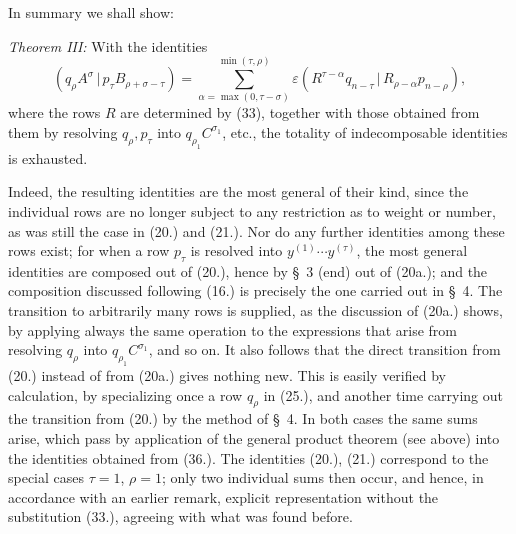 \documentclass[11pt]{article}
\newcommand{\pair}[2]{(#1\,|\,#2)}
\newcommand{\eps}{\varepsilon}
\begin{document}
In summary we shall show:

\emph{Theorem III:} With the identities
\begin{equation}
 \pair{q_\rho A^\sigma}{p_\tau B_{\rho+\sigma-\tau}}
 =\sum_{\alpha=\max(0,\tau-\sigma)}^{\min(\tau,\rho)}
 \eps\pair{R^{\tau-\alpha}q_{n-\tau}}{R_{\rho-\alpha}p_{n-\rho}},
\tag{36}
\end{equation}
where the rows $R$ are determined by (33), together with those obtained from them by resolving $q_\rho,p_\tau$ into $q_{\rho_1}C^{\sigma_1}$, etc., the totality of indecomposable identities is exhausted.

Indeed, the resulting identities are the most general of their kind, since the individual rows are no longer subject to any restriction as to weight or number, as was still the case in (20.) and (21.). Nor do any further identities among these rows exist; for when a row $p_\tau$ is resolved into $y^{(1)}\cdots y^{(\tau)}$, the most general identities are composed out of (20.), hence by \S\ 3 (end) out of (20a.); and the composition discussed following (16.) is precisely the one carried out in \S\ 4. The transition to arbitrarily many rows is supplied, as the discussion of (20a.) shows, by applying always the same operation to the expressions that arise from resolving $q_\rho$ into $q_{\rho_1}C^{\sigma_1}$, and so on. It also follows that the direct transition from (20.) instead of from (20a.) gives nothing new. This is easily verified by calculation, by specializing once a row $q_\rho$ in (25.), and another time carrying out the transition from (20.) by the method of \S\ 4. In both cases the same sums arise, which pass by application of the general product theorem (see above) into the identities obtained from (36.). The identities (20.), (21.) correspond to the special cases $\tau=1$, $\rho=1$; only two individual sums then occur, and hence, in accordance with an earlier remark, explicit representation without the substitution (33.), agreeing with what was found before.
\end{document}
